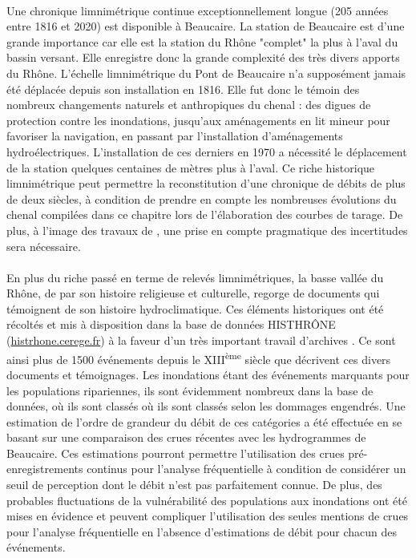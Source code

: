 \documentclass[11pt]{article}
\begin{document}
	\paragraph{} Une chronique limnimétrique continue exceptionnellement longue (205 années entre 1816 et 2020) est disponible à Beaucaire. La station de Beaucaire est d'une grande importance car elle est la station du Rhône "complet" la plus à l'aval du bassin versant. Elle enregistre donc la grande complexité des très divers apports du Rhône. L'échelle limnimétrique du Pont de Beaucaire n'a supposément jamais été déplacée depuis son installation en 1816. Elle fut donc le témoin des nombreux changements naturels et anthropiques du chenal : des digues de protection contre les inondations, jusqu'aux aménagements en lit mineur pour favoriser la navigation, en passant par l'installation d'aménagements hydroélectriques. L'installation de ces derniers en 1970 a nécessité le déplacement de la station quelques centaines de mètres plus à l'aval. Ce riche historique limnimétrique peut permettre la reconstitution d'une chronique de débits de plus de deux siècles, à condition de prendre en compte les nombreuses évolutions du chenal compilées dans ce chapitre lors de l'élaboration des courbes de tarage. De plus, à l'image des travaux de \citet{bard_actualisation_2018}, une prise en compte pragmatique des incertitudes sera nécessaire. 
	
	\paragraph{} En plus du riche passé en terme de relevés limnimétriques, la basse vallée du Rhône, de par son histoire religieuse et culturelle, regorge de documents qui témoignent de son histoire hydroclimatique. Ces éléments historiques ont été récoltés et mis à disposition dans la base de données HISTHRÔNE (\url{histrhone.cerege.fr}) à la faveur d'un très important travail d'archives \citep{pichard_sept_2014}. Ce sont ainsi plus de 1500 événements depuis le XIII\textsuperscript{ème} siècle que décrivent ces divers documents et témoignages. Les inondations étant des événements marquants pour les populations ripariennes, ils sont évidemment nombreux dans la base de données, où ils sont classés où ils sont classés selon les dommages engendrés. Une estimation de l'ordre de grandeur du débit de ces catégories a été effectuée en se basant sur une comparaison des crues récentes avec les hydrogrammes de Beaucaire. Ces estimations pourront permettre l'utilisation des crues pré-enregistrements continus pour l'analyse fréquentielle à condition de considérer un seuil de perception dont le débit n'est pas parfaitement connue. De plus, des probables fluctuations de la vulnérabilité des populations aux inondations ont été mises en évidence et peuvent compliquer l'utilisation des seules mentions de crues pour l'analyse fréquentielle en l'absence d'estimations de débit pour chacun des événements. 
\end{document}
